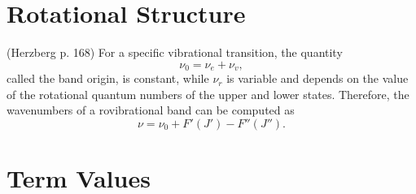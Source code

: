 \documentclass[11pt, twoside, fleqn]{report}
\begin{document}
    \section{Rotational Structure}

    (Herzberg p. 168)
    For a specific vibrational transition, the quantity
    \begin{equation*}
        \nu_0 = \nu_e + \nu_v,
    \end{equation*}
    called the band origin, is constant, while $\nu_r$ is variable and depends on the value of the rotational quantum numbers of the upper and lower states. Therefore, the wavenumbers of a rovibrational band can be computed as
    \begin{equation*}
        \nu = \nu_0 + F'(J') - F''(J'').
    \end{equation*}

    \section{Term Values}
\end{document}
